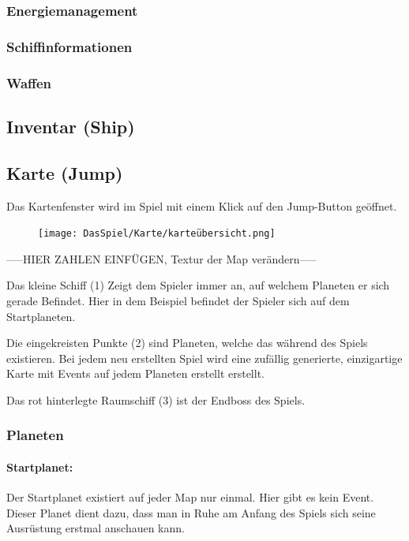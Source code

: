 \documentclass[fontsize=12pt,paper=a4,twoside]{scrartcl}
\begin{document}

\subsubsection{Energiemanagement}

\subsubsection{Schiffinformationen}

\subsubsection{Waffen}


\subsection{Inventar (Ship)}


\subsection{Karte (Jump)}

Das Kartenfenster wird im Spiel mit einem Klick auf den Jump-Button geöffnet. 
\begin{figure}[h!]
\centering
\texttt{[image: DasSpiel/Karte/karteübersicht.png]}
\end{figure} 

-----HIER ZAHLEN EINFÜGEN, Textur der Map verändern-----

Das kleine Schiff (1) Zeigt dem Spieler immer an, auf welchem Planeten er sich gerade Befindet. Hier in dem Beispiel befindet der Spieler sich auf dem Startplaneten. 

Die eingekreisten Punkte (2) sind Planeten, welche das während des Spiels existieren. Bei jedem neu erstellten Spiel wird eine zufällig generierte, einzigartige Karte mit Events auf jedem Planeten erstellt erstellt. 

Das rot hinterlegte Raumschiff (3) ist der Endboss des Spiels. 

\subsubsection{Planeten}

\paragraph{Startplanet: }
Der Startplanet existiert auf jeder Map nur einmal. Hier gibt es kein Event. Dieser Planet dient dazu, dass man in Ruhe am Anfang des Spiels sich seine Ausrüstung erstmal anschauen kann. 
\end{document}
